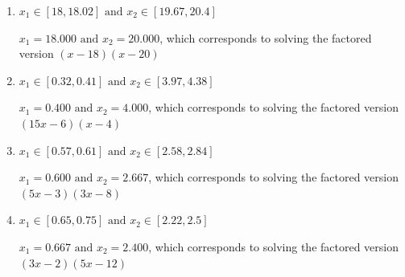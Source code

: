 \documentclass{extbook}[14pt]
\begin{document}
\begin{enumerate}
{\begin{enumerate}[label=\Alph*.]
* $x_1 = 1.200 \text{ and } x_2 = 1.333$, which is the correct option. Obtained by solving the factored version $(5x -6)(3x -4)$
\item \( x_1 \in [18, 18.02] \text{ and } x_2 \in [19.67, 20.4] \)

$x_1 = 18.000 \text{ and } x_2 = 20.000$, which corresponds to solving the factored version $(x -18)(x -20)$
\item \( x_1 \in [0.32, 0.41] \text{ and } x_2 \in [3.97, 4.38] \)

$x_1 = 0.400 \text{ and } x_2 = 4.000$, which corresponds to solving the factored version $(15x -6)(x -4)$
\item \( x_1 \in [0.57, 0.61] \text{ and } x_2 \in [2.58, 2.84] \)

$x_1 = 0.600 \text{ and } x_2 = 2.667$, which corresponds to solving the factored version $(5x -3)(3x -8)$
\item \( x_1 \in [0.65, 0.75] \text{ and } x_2 \in [2.22, 2.5] \)

$x_1 = 0.667 \text{ and } x_2 = 2.400$, which corresponds to solving the factored version $(3x -2)(5x -12)$
\end{enumerate}

}
\end{enumerate}
\end{document}
